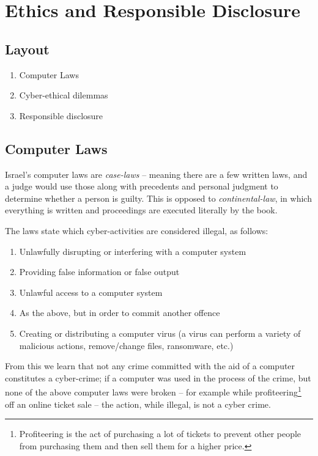 \chapter{Ethics and Responsible Disclosure} \label{ethics_chapter}

\section*{Layout}

\begin{enumerate}
    \item Computer Laws
    \item Cyber-ethical dilemmas
    \item Responsible disclosure
\end{enumerate}

\section{Computer Laws}\label{sec:comp_laws}

Israel's computer laws are \textit{case-laws} – meaning there are a few written
laws, and a judge would use those along with precedents and personal judgment to
determine whether a person is guilty. This is opposed to
\textit{continental-law}, in which everything is written and proceedings are
executed literally by the book.

The laws state which cyber-activities are considered illegal, as follows:
\begin{enumerate}
    \item Unlawfully disrupting or interfering with a computer system
    \item Providing false information or false output
    \item Unlawful access to a computer system
    \item As the above, but in order to commit another offence
    \item Creating or distributing a computer virus (a virus can perform a
    variety of malicious actions, remove/change files, ransomware, etc.)
\end{enumerate}

From this we learn that not any crime committed with the aid of a computer
constitutes a cyber-crime; if a computer was used in the process of the crime,
but none of the above computer laws were broken -- for example while
profiteering\footnote{Profiteering is the act of purchasing a lot of tickets to
prevent other people from purchasing them and then sell them for a higher
price.} off an online ticket sale -- the action, while illegal, is not a cyber
crime.


